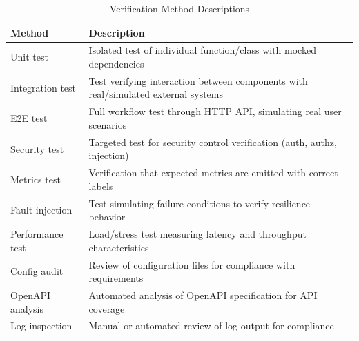 \begin{table}[htbp]
\centering
\caption{Verification Method Descriptions}
\label{tab:verification-legend}
\small
\begin{tabularx}{\textwidth}{|l|X|}
\hline
\textbf{Method} & \textbf{Description} \\
\hline
Unit test & Isolated test of individual function/class with mocked dependencies \\
\hline
Integration test & Test verifying interaction between components with real/simulated external systems \\
\hline
E2E test & Full workflow test through HTTP API, simulating real user scenarios \\
\hline
Security test & Targeted test for security control verification (auth, authz, injection) \\
\hline
Metrics test & Verification that expected metrics are emitted with correct labels \\
\hline
Fault injection & Test simulating failure conditions to verify resilience behavior \\
\hline
Performance test & Load/stress test measuring latency and throughput characteristics \\
\hline
Config audit & Review of configuration files for compliance with requirements \\
\hline
OpenAPI analysis & Automated analysis of OpenAPI specification for API coverage \\
\hline
Log inspection & Manual or automated review of log output for compliance \\
\hline
\end{tabularx}
\end{table}

